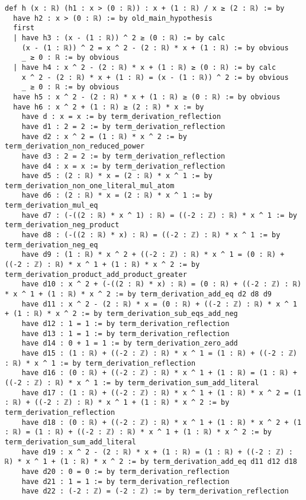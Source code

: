 \documentclass{article}
\begin{document}
\begin{tcolorbox}[colback=white!10, width=\linewidth]
\begin{lstlisting}[language=Lean4]
def h (x : ℝ) (h1 : x > (0 : ℝ)) : x + (1 : ℝ) / x ≥ (2 : ℝ) := by
  have h2 : x > (0 : ℝ) := by old_main_hypothesis
  first
  | have h3 : (x - (1 : ℝ)) ^ 2 ≥ (0 : ℝ) := by calc
    (x - (1 : ℝ)) ^ 2 = x ^ 2 - (2 : ℝ) * x + (1 : ℝ) := by obvious
    _ ≥ 0 : ℝ := by obvious
  | have h4 : x ^ 2 - (2 : ℝ) * x + (1 : ℝ) ≥ (0 : ℝ) := by calc
    x ^ 2 - (2 : ℝ) * x + (1 : ℝ) = (x - (1 : ℝ)) ^ 2 := by obvious
    _ ≥ 0 : ℝ := by obvious
  have h5 : x ^ 2 - (2 : ℝ) * x + (1 : ℝ) ≥ (0 : ℝ) := by obvious
  have h6 : x ^ 2 + (1 : ℝ) ≥ (2 : ℝ) * x := by
    have d : x = x := by term_derivation_reflection
    have d1 : 2 = 2 := by term_derivation_reflection
    have d2 : x ^ 2 = (1 : ℝ) * x ^ 2 := by term_derivation_non_reduced_power
    have d3 : 2 = 2 := by term_derivation_reflection
    have d4 : x = x := by term_derivation_reflection
    have d5 : (2 : ℝ) * x = (2 : ℝ) * x ^ 1 := by term_derivation_non_one_literal_mul_atom
    have d6 : (2 : ℝ) * x = (2 : ℝ) * x ^ 1 := by term_derivation_mul_eq
    have d7 : (-((2 : ℝ) * x ^ 1) : ℝ) = ((-2 : ℤ) : ℝ) * x ^ 1 := by term_derivation_neg_product
    have d8 : (-((2 : ℝ) * x) : ℝ) = ((-2 : ℤ) : ℝ) * x ^ 1 := by term_derivation_neg_eq
    have d9 : (1 : ℝ) * x ^ 2 + ((-2 : ℤ) : ℝ) * x ^ 1 = (0 : ℝ) + ((-2 : ℤ) : ℝ) * x ^ 1 + (1 : ℝ) * x ^ 2 := by term_derivation_product_add_product_greater
    have d10 : x ^ 2 + (-((2 : ℝ) * x) : ℝ) = (0 : ℝ) + ((-2 : ℤ) : ℝ) * x ^ 1 + (1 : ℝ) * x ^ 2 := by term_derivation_add_eq d2 d8 d9
    have d11 : x ^ 2 - (2 : ℝ) * x = (0 : ℝ) + ((-2 : ℤ) : ℝ) * x ^ 1 + (1 : ℝ) * x ^ 2 := by term_derivation_sub_eqs_add_neg
    have d12 : 1 = 1 := by term_derivation_reflection
    have d13 : 1 = 1 := by term_derivation_reflection
    have d14 : 0 + 1 = 1 := by term_derivation_zero_add
    have d15 : (1 : ℝ) + ((-2 : ℤ) : ℝ) * x ^ 1 = (1 : ℝ) + ((-2 : ℤ) : ℝ) * x ^ 1 := by term_derivation_reflection
    have d16 : (0 : ℝ) + ((-2 : ℤ) : ℝ) * x ^ 1 + (1 : ℝ) = (1 : ℝ) + ((-2 : ℤ) : ℝ) * x ^ 1 := by term_derivation_sum_add_literal
    have d17 : (1 : ℝ) + ((-2 : ℤ) : ℝ) * x ^ 1 + (1 : ℝ) * x ^ 2 = (1 : ℝ) + ((-2 : ℤ) : ℝ) * x ^ 1 + (1 : ℝ) * x ^ 2 := by term_derivation_reflection
    have d18 : (0 : ℝ) + ((-2 : ℤ) : ℝ) * x ^ 1 + (1 : ℝ) * x ^ 2 + (1 : ℝ) = (1 : ℝ) + ((-2 : ℤ) : ℝ) * x ^ 1 + (1 : ℝ) * x ^ 2 := by term_derivation_sum_add_literal
    have d19 : x ^ 2 - (2 : ℝ) * x + (1 : ℝ) = (1 : ℝ) + ((-2 : ℤ) : ℝ) * x ^ 1 + (1 : ℝ) * x ^ 2 := by term_derivation_add_eq d11 d12 d18
    have d20 : 0 = 0 := by term_derivation_reflection
    have d21 : 1 = 1 := by term_derivation_reflection
    have d22 : (-2 : ℤ) = (-2 : ℤ) := by term_derivation_reflection

\end{lstlisting}
\end{tcolorbox}
\end{document}
